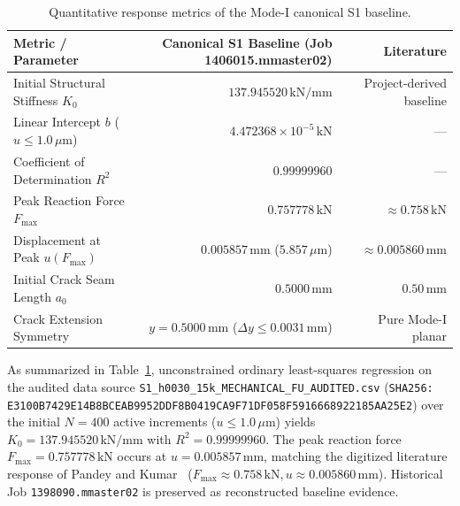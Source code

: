 \begin{table}[htbp]
\centering
\caption{Quantitative response metrics of the Mode-I canonical S1 baseline.}
\label{tab:reference_anchor_metrics}
\small
\begin{tabular}{lrr}
\toprule
\textbf{Metric / Parameter} & \textbf{Canonical S1 Baseline (Job 1406015.mmaster02)} & \textbf{Literature \citep{pandey2025}} \\
\midrule
Initial Structural Stiffness $K_0$ & $137.945520\,\text{kN/mm}$ & Project-derived baseline \\
Linear Intercept $b$ ($u \le 1.0\,\mu\text{m}$) & $4.472368 \times 10^{-5}\,\text{kN}$ & --- \\
Coefficient of Determination $R^2$ & $0.99999960$ & --- \\
Peak Reaction Force $F_{\max}$ & $0.757778\,\text{kN}$ & $\approx 0.758\,\text{kN}$ \\
Displacement at Peak $u(F_{\max})$ & $0.005857\,\text{mm}$ ($5.857\,\mu\text{m}$) & $\approx 0.005860\,\text{mm}$ \\
Initial Crack Seam Length $a_0$ & $0.5000\,\text{mm}$ & $0.50\,\text{mm}$ \\
Crack Extension Symmetry & $y = 0.5000\,\text{mm}$ ($\Delta y \le 0.0031\,\text{mm}$) & Pure Mode-I planar \\
\bottomrule
\end{tabular}
\end{table}

As summarized in Table~\ref{tab:reference_anchor_metrics}, unconstrained ordinary least-squares regression on the audited data source \nolinkurl{S1_h0030_15k_MECHANICAL_FU_AUDITED.csv} (\nolinkurl{SHA256: E3100B7429E14B8BCEAB9952DDF8B0419CA9F71DF058F5916668922185AA25E2}) over the initial $N = 400$ active increments ($u \le 1.0\,\mu\text{m}$) yields $K_0 = 137.945520\,\text{kN/mm}$ with $R^2 = 0.99999960$. The peak reaction force $F_{\max} = 0.757778\,\text{kN}$ occurs at $u = 0.005857\,\text{mm}$, matching the digitized literature response of Pandey and Kumar~\cite{pandey2025} ($F_{\max} \approx 0.758\,\text{kN}, u \approx 0.005860\,\text{mm}$). Historical Job \texttt{1398090.mmaster02} is preserved as reconstructed baseline evidence.
